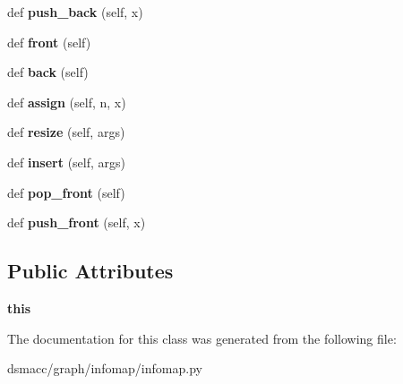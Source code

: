 \begin{DoxyCompactItemize}
def {\bfseries push\+\_\+back} (self, x)
\item 
\mbox{\label{classdsmacc_1_1graph_1_1infomap_1_1infomap_1_1UIntDeque_ab786edc70e48dd04fd194505ca91c4fa}} 
def {\bfseries front} (self)
\item 
\mbox{\label{classdsmacc_1_1graph_1_1infomap_1_1infomap_1_1UIntDeque_aed7fa997cd36574ecc5e80a97c0ad089}} 
def {\bfseries back} (self)
\item 
\mbox{\label{classdsmacc_1_1graph_1_1infomap_1_1infomap_1_1UIntDeque_ac09239bc84ac77cb958f23e034c6d837}} 
def {\bfseries assign} (self, n, x)
\item 
\mbox{\label{classdsmacc_1_1graph_1_1infomap_1_1infomap_1_1UIntDeque_abd787ec86cbd312279ffd10b0398b1ad}} 
def {\bfseries resize} (self, args)
\item 
\mbox{\label{classdsmacc_1_1graph_1_1infomap_1_1infomap_1_1UIntDeque_a23cea33f25031b16c85f1d95fb08acd0}} 
def {\bfseries insert} (self, args)
\item 
\mbox{\label{classdsmacc_1_1graph_1_1infomap_1_1infomap_1_1UIntDeque_aec660df3e6b7ae9f0d47cd57c1a5cd40}} 
def {\bfseries pop\+\_\+front} (self)
\item 
\mbox{\label{classdsmacc_1_1graph_1_1infomap_1_1infomap_1_1UIntDeque_ad07e9c4744ee0f4a8f4f965e9a954c1a}} 
def {\bfseries push\+\_\+front} (self, x)
\end{DoxyCompactItemize}
\subsection*{Public Attributes}
\begin{DoxyCompactItemize}
\item 
\mbox{\label{classdsmacc_1_1graph_1_1infomap_1_1infomap_1_1UIntDeque_a957f0b77c2bc9b66a4dc7cf6de858258}} 
{\bfseries this}
\end{DoxyCompactItemize}


The documentation for this class was generated from the following file\+:\begin{DoxyCompactItemize}
\item 
dsmacc/graph/infomap/infomap.\+py\end{DoxyCompactItemize}
